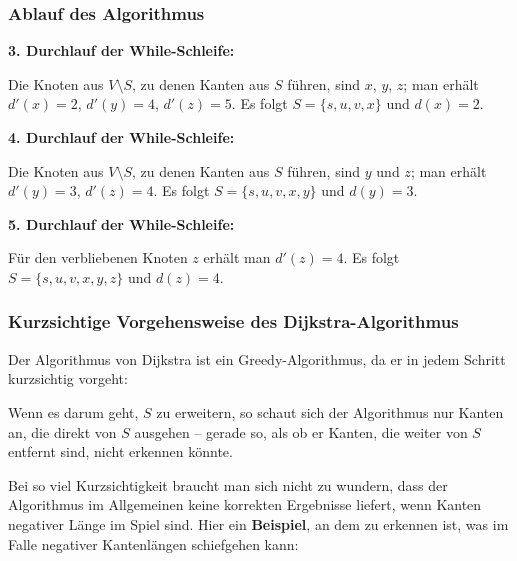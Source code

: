 \documentclass[smaller]{beamer}
\begin{document}
\begin{frame}
\frametitle{Ablauf des Algorithmus}
\textbf{3.	Durchlauf der While-Schleife:} 

Die Knoten aus $V \setminus S$, zu denen Kanten aus $S$ führen, sind $x$, $y$, $z$;  man erhält $d'(x) = 2$, $d'(y) = 4$, $d'(z) = 5$. Es folgt $S = \bigl\{ s,u,v,x \bigr\}$ und $d(x) = 2$. \\ \vspace*{0.2cm}


\textbf{4.	Durchlauf der While-Schleife:} 

Die Knoten aus $V \setminus S$, zu denen Kanten aus $S$ führen, sind $y$ und $z$;  man erhält $d'(y) = 3$, $d'(z) = 4$. Es folgt $S = \bigl\{ s,u,v,x,y \bigr\}$ und $d(y) = 3$. \\ \vspace*{0.2cm}

\textbf{5.	Durchlauf der While-Schleife:} 

Für den verbliebenen Knoten $z$ erhält man $d'(z)=4$. Es folgt $S = \bigl\{ s,u,v,x,y,z \bigr\}$ und $d(z) = 4$.
\end{frame}

\begin{frame}
\frametitle{Kurzsichtige Vorgehensweise des Dijkstra-Algorithmus}
Der Algorithmus von Dijkstra ist ein Greedy-Algorithmus, da er in jedem Schritt \alert{kurzsichtig} vorgeht: \\ \vspace*{0.2cm}
 
Wenn es darum geht, $S$ zu erweitern, so schaut sich der Algorithmus nur Kanten an, die direkt von $S$ ausgehen -- gerade so, als ob er Kanten, die weiter von $S$ entfernt sind, nicht erkennen könnte. \\ \vspace*{0.2cm}

Bei so viel Kurzsichtigkeit braucht man sich nicht zu wundern, dass der Algorithmus im Allgemeinen keine korrekten Ergebnisse liefert, wenn Kanten negativer Länge im Spiel sind. Hier ein \textbf{Beispiel}, an dem zu erkennen ist, was im Falle negativer Kantenlängen schiefgehen kann:
\end{frame}
\end{document}
